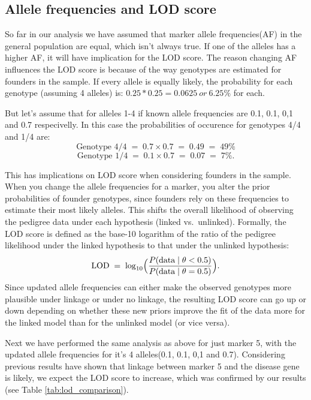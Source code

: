 \documentclass[a4paper,12pt]{article}
\begin{document}
\subsection{Allele frequencies and LOD score}

So far in our analysis we have assumed that marker allele frequencies(AF) in the general population 
are equal, which isn't always true. If one of the alleles has a higher AF, it will have 
implication for the LOD score.
The reason changing AF influences the LOD score is because of the way genotypes are estimated for 
founders in the sample. If every allele is equally likely, the probability for each 
genotype (assuming 4 alleles) is: 
$\mathit{0.25 * 0.25 = 0.0625 \ or \ 6.25\%}$ for each. 

But let's assume that for alleles 1-4 if known allele frequencies are 0.1, 0.1, 0,1 and 0.7 respecivelly. 
In this case the probabilities of occurence for genotypes 4/4 and 1/4 are: 
\[
\text{Genotype } 4/4 \;=\; 0.7 \times 0.7 \;=\; 0.49 \;=\; 49\%
\]
\[
\text{Genotype } 1/4 \;=\; 0.1 \times 0.7 \;=\; 0.07 \;=\; 7\%.
\]

This has implications on LOD score when considering founders in the sample. When you change the allele 
frequencies for a marker, you alter the prior probabilities of founder genotypes, since founders rely 
on these frequencies to estimate their most likely alleles. This shifts the overall likelihood of 
observing the pedigree data under each hypothesis (linked vs.\ unlinked). Formally, the LOD score 
is defined as the base-10 logarithm of the ratio of the pedigree likelihood under the linked hypothesis 
to that under the unlinked hypothesis:
\[
\mathrm{LOD} \;=\; \log_{10} \Bigl(
  \frac{P(\text{data} \mid \theta < 0.5)}{P(\text{data} \mid \theta = 0.5)}
\Bigr).
\]
Since updated allele frequencies can either make the observed genotypes more plausible under linkage 
or under no linkage, the resulting LOD score can go up or down depending on whether these new priors 
improve the fit of the data more for the linked model than for the unlinked model (or vice versa).

Next we have performed the same analysis as above for just marker 5, with the updated allele frequencies 
for it's 4 alleles(0.1, 0.1, 0,1 and 0.7). Considering previous results have shown that linkage between 
marker 5 and the disease gene is likely, we expect the LOD score to increase, which was confirmed 
by our results (see Table \ref{tab:lod_comparison}).
\end{document}
